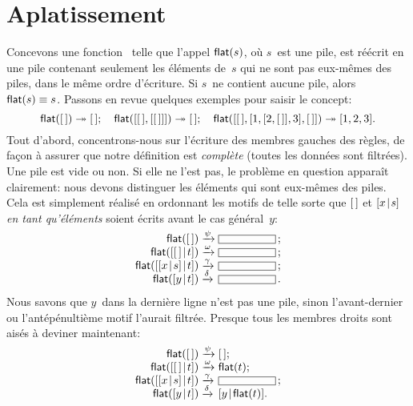 \section{Aplatissement}
\label{sec_flattening}

Concevons une fonction~ telle que
l'appel \(\textsf{flat}(s)\), où \(s\)~est une pile, est réécrit en une
pile contenant seulement les éléments de~\(s\) qui ne sont pas
eux-mêmes des piles, dans le même ordre d'écriture. Si \(s\)~ne
contient aucune pile, alors \(\textsf{flat}(s) \equiv s\). Passons en
revue quelques exemples pour saisir
le concept:
\begin{equation*}
\textsf{flat}([\,]) \twoheadrightarrow [\,]; \quad
\textsf{flat}([[\,],[[\,]]]) \twoheadrightarrow [\,];\quad
\textsf{flat}([[\,],[1,[2,[\,]],3],[\,]]) \twoheadrightarrow [1,2,3].
\end{equation*}
Tout d'abord, concentrons-nous sur l'écriture des membres gauches des
règles, de façon à assurer que notre définition est \emph{complète}
(toutes les données sont filtrées). Une pile est vide ou non. Si elle
ne l'est pas, le problème en question apparaît clairement: nous devons
distinguer les éléments qui sont eux-mêmes des piles. Cela est
simplement réalisé en ordonnant les motifs de telle sorte que \([\,]\)
et \([{x}\!\mid\!{s}]\) \emph{en tant qu'éléments} soient écrits avant le
cas général~\(y\):
\begin{equation*}
\begin{array}{r@{\;}l@{\;}l}
\fun{flat}(\el)                   & \xrightarrow{\smash{\psi}}   & \fbcode{CCCCCCC}\,;\\
\fun{flat}(\cons{\el}{t})         & \xrightarrow{\smash{\omega}} & \fbcode{CCCCCCC}\,;\\
\fun{flat}(\cons{\cons{x}{s}}{t}) & \xrightarrow{\smash{\gamma}} & \fbcode{CCCCCCC}\,;\\
\fun{flat}(\cons{y}{t})           & \xrightarrow{\smash{\delta}} & \fbcode{CCCCCCC}\,.
\end{array}
\end{equation*}
Nous savons que \(y\)~dans la dernière ligne n'est pas une pile, sinon
l'avant-dernier ou l'antépénultième motif l'aurait filtrée. Presque tous les mem\-bres droits sont aisés à deviner maintenant:
\begin{equation*}
\begin{array}{r@{\;}l@{\;}l}
\fun{flat}(\el)                   & \xrightarrow{\smash{\psi}}   & \el;\\
\fun{flat}(\cons{\el}{t})         & \xrightarrow{\smash{\omega}} & \fun{flat}(t);\\
\fun{flat}(\cons{\cons{x}{s}}{t}) & \xrightarrow{\smash{\gamma}} & \fbcode{CCCCCCC}\,;\\
\fun{flat}(\cons{y}{t})           & \xrightarrow{\smash{\delta}} & \cons{y}{\fun{flat}(t)}.
\end{array}
\end{equation*}
